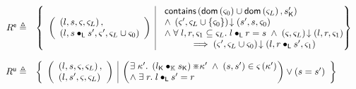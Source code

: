 \begin{definition}[Rely]
%
\[
\begin{array}{r l}
	\extendR \eqdef & 
	\left\{
	\begin{array}{l | l}
		\left(
		\begin{array}{l}
			\left(l, s, \amod{}, \amod{L} \right),\\
			\left(l, s \composeL s', \amod{}', \amod{L} \cup \amod{0} \right)
		\end{array}
		\right)
		&
		\begin{array}{l}
			\contains{\dom{\amod{0}} \cup \dom{\amod{L}}}{\capPart{s'}}\\
			\land\;
			\extendsAM{\amod{}', \amod{L} \cup \{\amod{0}\}}{s'}{s}{\amod{0}}		\\
			
			\land\;\for{l, r, \amod{1} \subseteq \amod{L}} l \composeL r = s \;\land\; \extendsAM{\amod{}, \amod{L}}{l}{r}{\amod{1}}\\
			\hspace*{1cm} \implies \extendsAM{\amod{}', \amod{L} \cup \amod{0}}{l}{r \composeL s'}{\amod{1}}\\
			

		\end{array}
		\hspace*{-0.15cm}
	\end{array}	
	\hspace*{-0.2cm}
	\right\}\\\\
	
	
	\updateR \eqdef & 
	\left\{
	\begin{array}{l | l}
		\left(
		\begin{array}{l}
			\left(l, s, \amod{}, \amod{L} \right),\\
			\left(l, s', \amod{}, \amod{L}\right)
		\end{array}
		\right)
		&
		\left(
		\hspace*{-0.15cm}
		\begin{array}{l}
			\exsts{\ca{}'} \left( \capPart{l} \composeCap \capPart{s} \right) \separate \ca{}' \;\land\; (s, s') \in \amod{} \left(\ca{}'\right) \\
			\land\; \exsts{r} l \composeL s' = r
		\end{array}
		\hspace*{-0.15cm}
		\right)
		\lor
		(s = s')
	\end{array}	
	\right\}\\\\
	

\end{array}\]
\end{definition}

